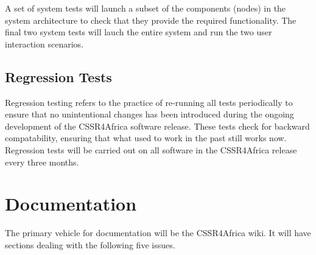 \documentclass{CSSRforAfrica}
\begin{document}
A set of system tests will launch a subset of the components (nodes) in the system architecture to check that they provide  the required functionality. The final two system tests will lauch the entire system and run the two user interaction scenarios.

\subsection{Regression Tests}
\label{section:regression_tests}
Regression testing refers to the practice of re-running all  tests periodically to ensure that no  unintentional changes has been introduced during the ongoing development of the CSSR4Africa software release.   These tests check for backward compatability, ensuring that what used to work in the past still works now.    Regression tests will be carried out on all software in the CSSR4Africa release every three months.

 


\section{Documentation}
\label{section:documentation_standards}

The primary vehicle for documentation will be the CSSR4Africa wiki. It will have sections dealing with the following five issues.
\end{document}
